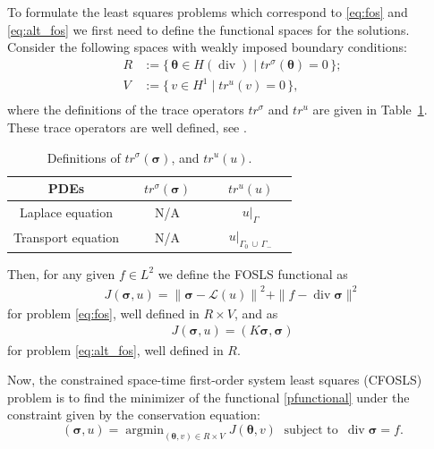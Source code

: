 \documentclass[a4paper,12pt]{amsart}
\numberwithin{equation}{section}
\renewcommand{\div}{\operatorname{div}}
\renewcommand{\L}{{\mathcal L}}
\def\btheta{{\boldsymbol \theta}}
\def\bsigma{{\boldsymbol \sigma}}
\DeclareMathOperator*{\argmin}{argmin}
\begin{document}
To formulate the least squares problems which correspond to \eqref{eq:fos} and \eqref{eq:alt_fos} we first need to define the functional spaces for the solutions.
Consider the following spaces with weakly imposed boundary conditions:
\begin{equation}
\begin{split}
R & := \{\,\btheta \in H(\div) \;|\; tr^\sigma(\btheta) = 0\,\};\\
V & := \{\,v \in H^1 \;|\; tr^u(v) = 0\,\},\\
\end{split}
\label{eq:spaces}
\end{equation}
where the definitions of the trace operators $tr^{\sigma}$ and $tr^u$ are given in Table~\ref{tab:FOSLS_operators}. These trace operators are well defined, see \cite{gatica}. 

\begin{table}[h]
\caption{Definitions of $tr^{\sigma}(\bsigma)$, and $tr^u(u)$.}
\label{tab:FOSLS_operators}
\begin{tabular}{ |c||c|c|} \hline
PDEs & $\quad tr^{\sigma}(\bsigma) \quad$ & $\quad tr^u(u) \quad$  \\ \hline
Laplace equation & N/A & $u|_\Gamma$ \\ \hline
Transport equation & N/A & $u|_{\Gamma_0\,\cup\,\Gamma_-}$ \\ \hline
\end{tabular}
\end{table}

Then, for any given $f\in L^2$ we define the FOSLS functional as
\begin{align}
J(\bsigma, u) = \left\| \bsigma - \L(u) \right\|^2 + \| f-\div \bsigma \| ^2 \label{pfunctional}
\end{align} 
for problem \eqref{eq:fos}, well defined in $R \times V$, and as
\begin{align}
J(\bsigma, u) = \left( K \bsigma, \bsigma \right) \label{pfunctional}
\end{align} 
for problem \eqref{eq:alt_fos}, well defined in $R$.

Now, the constrained space-time first-order system least squares (CFOSLS) problem is to find the minimizer of the functional \eqref{pfunctional} 
under the constraint given by the conservation equation:
\begin{equation}
(\bsigma, u) = \argmin_{(\btheta, v)\in R\times V} J(\btheta, v) \;\text{ subject to } \, \div \bsigma = f. 
\label{eq:minimization}
\end{equation}
\end{document}
